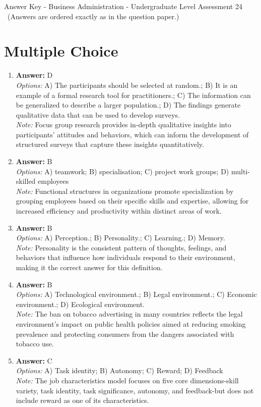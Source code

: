 \documentclass[12pt]{article}
\begin{document}
\begin{center}
Answer Key - Business Administration - Undergraduate Level Assessment 24 \
\small (Answers are ordered exactly as in the question paper.)
\end{center}

\section*{Multiple Choice}
\begin{enumerate}[label=\arabic*.]
\item \textbf{Answer:} D
\\ \textit{Options:} A) The participants should be selected at random.; B) It is an example of a formal research tool for practitioners.; C) The information can be generalized to describe a larger population.; D) The findings generate qualitative data that can be used to develop surveys.
\\ \textit{Note:} Focus group research provides in-depth qualitative insights into participants' attitudes and behaviors, which can inform the development of structured surveys that capture these insights quantitatively.
\item \textbf{Answer:} B
\\ \textit{Options:} A) teamwork; B) specialisation; C) project work groups; D) multi-skilled employees
\\ \textit{Note:} Functional structures in organizations promote specialization by grouping employees based on their specific skills and expertise, allowing for increased efficiency and productivity within distinct areas of work.
\item \textbf{Answer:} B
\\ \textit{Options:} A) Perception.; B) Personality.; C) Learning.; D) Memory.
\\ \textit{Note:} Personality is the consistent pattern of thoughts, feelings, and behaviors that influence how individuals respond to their environment, making it the correct answer for this definition.
\item \textbf{Answer:} B
\\ \textit{Options:} A) Technological environment.; B) Legal environment.; C) Economic environment.; D) Ecological environment.
\\ \textit{Note:} The ban on tobacco advertising in many countries reflects the legal environment's impact on public health policies aimed at reducing smoking prevalence and protecting consumers from the dangers associated with tobacco use.
\item \textbf{Answer:} C
\\ \textit{Options:} A) Task identity; B) Autonomy; C) Reward; D) Feedback
\\ \textit{Note:} The job characteristics model focuses on five core dimensions-skill variety, task identity, task significance, autonomy, and feedback-but does not include reward as one of its characteristics.
\end{enumerate}
\end{document}
